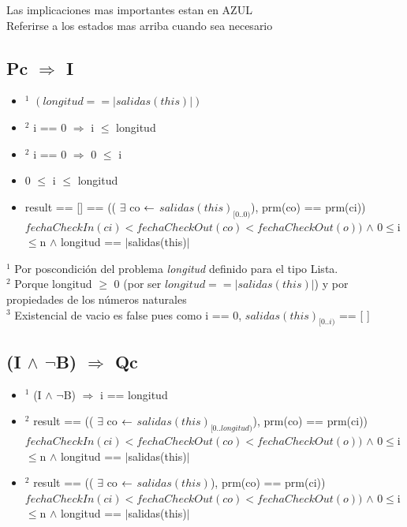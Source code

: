 \small Las implicaciones mas importantes estan en \textcolor{NavyBlue}{AZUL}\\
\small Referirse a los estados mas arriba cuando sea necesario\\
\vspace{2mm}

\subsection{Pc $ \Rightarrow $ I}
\begin{itemize}
	\item $ ^1 $ \textcolor{NavyBlue}{$(longitud == |salidas(this)|)$} \checkmark
	\item $ ^2 $ i == 0 $ \Rightarrow $ i $ \leq $ longitud
	\item $ ^2 $ i == 0  $ \Rightarrow $ 0 $ \leq $ i
	\item \textcolor{NavyBlue}{0 $ \leq $ i $ \leq $ longitud} \checkmark
	\item \textcolor{NavyBlue}{result == [] == (( $ \exists $ co $ \leftarrow $ $ salidas(this)_{[0..0)} $), prm(co) == prm(ci))$ fechaCheckIn(ci) < fechaCheckOut(co) < fechaCheckOut(o)) $ $ \land $ 0$ \leq $i$ \leq $n $ \land $ longitud == $|$salidas(this)$|$} \checkmark
\end{itemize}
\vspace{3mm}

\noindent $ ^1 $ Por poscondición del problema \emph{longitud} definido para el tipo Lista.\\
$ ^2 $ Porque longitud $\geq$ 0 (por ser $longitud == |salidas(this)|$) y por propiedades de los números naturales\\
$ ^3 $ Existencial de vacio es false pues como i == 0, $ salidas(this)_{[0..i)} $ == [ ]\\

\subsection{(I $ \land $ $ \lnot $B) $ \Rightarrow $ Qc}
\begin{itemize}
	\item $ ^1 $ (I $ \land $ $ \lnot $B) $ \Rightarrow $ i == longitud
	\item $ ^2 $ result == (( $ \exists $ co $ \leftarrow $ $ salidas(this)_{[0..longitud)} $), prm(co) == prm(ci)) $ fechaCheckIn(ci) < fechaCheckOut(co) < fechaCheckOut(o)) $ $ \land $ 0$ \leq $i$ \leq $n $ \land $ longitud == $|$salidas(this)$|$
	\item $ ^2 $ \textcolor{NavyBlue}{ result == (( $ \exists $ co $ \leftarrow $ $ salidas(this) $), prm(co) == prm(ci)) $ fechaCheckIn(ci) < fechaCheckOut(co) < fechaCheckOut(o)) $ $ \land $ 0$ \leq $i$ \leq $n $ \land $ longitud == $|$salidas(this)$|$} \checkmark
\end{itemize}
\vspace{3mm}


